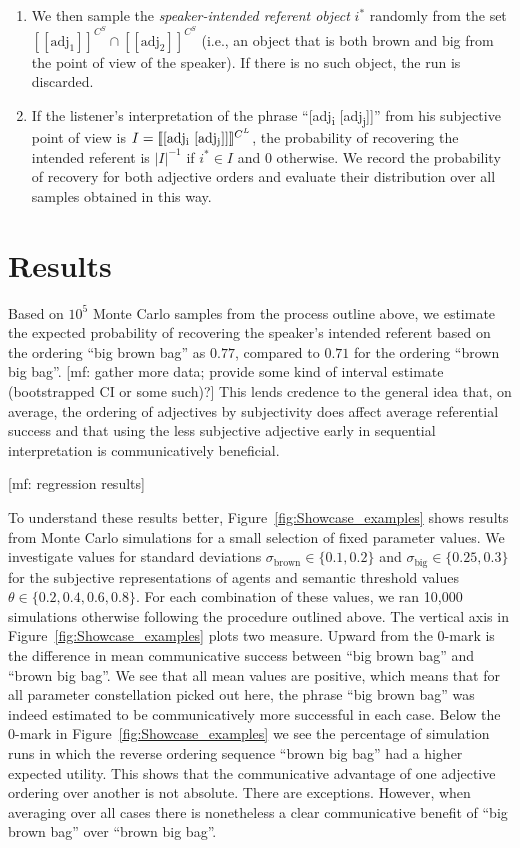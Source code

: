 \documentclass[10pt,a4paper]{article}
\newcommand{\den}[1]{\ensuremath{[\![#1]\!]}}
\newcommand{\mf}[1]{\textcolor{BrickRed}{[mf: #1]}}
\begin{document}
\begin{enumerate}
\item We then sample the \emph{speaker-intended referent object} $i^*$ randomly
  from the set $\den{\text{adj}_1}^{C^S} \cap \den{\text{adj}_2}^{C^S}$ (i.e.,
  an object that is both brown and big from the point of view of the speaker).
  If there is no such object, the run is discarded.
  
\item If the listener's interpretation of the phrase ``[adj\textsubscript{i}
  [adj\textsubscript{j}]]'' from his subjective point of view is $I =
  \den{\text{[adj\textsubscript{i} [adj\textsubscript{j}]]}}^{C^L}$, the
  probability of recovering the intended referent is $|I|^{-1}$ if $i^* \in I$
  and 0 otherwise. We record the probability of recovery for both adjective
  orders and evaluate their distribution over all samples obtained in this way.

\end{enumerate}

\section{Results}

Based on $10^5$ Monte Carlo samples from the process outline above, we estimate the expected probability of recovering the speaker's intended referent based on the ordering ``big brown bag'' as $0.77$, compared to $0.71$ for the ordering ``brown big bag''. \mf{gather more data; provide some kind of interval estimate (bootstrapped CI or some such)?} This lends credence to the general idea that, on average, the ordering of adjectives by subjectivity does affect average referential success and that using the less subjective adjective early in sequential interpretation is communicatively beneficial.

\mf{regression results}

To understand these results better, Figure~\ref{fig:Showcase_examples} shows results from Monte Carlo simulations for a small selection of fixed parameter values. We investigate values for standard deviations $\sigma_{\text{brown}} \in \{0.1, 0.2\}$ and $\sigma_{\text{big}} \in \{0.25, 0.3\}$ for the subjective representations of agents and semantic threshold values $\theta \in \{ 0.2, 0.4, 0.6, 0.8 \}$. For each combination of these values, we ran 10,000 simulations otherwise following the procedure outlined above. The vertical axis in Figure~\ref{fig:Showcase_examples} plots two measure. Upward from the 0-mark is the difference in mean communicative success between ``big brown bag'' and ``brown big bag''. We see that all mean values are positive, which means that for all parameter constellation picked out here, the phrase ``big brown bag'' was indeed estimated to be communicatively more successful in each case. Below the 0-mark in Figure~\ref{fig:Showcase_examples} we see the percentage of simulation runs in which the reverse ordering sequence ``brown big bag'' had a higher expected utility. This shows that the communicative advantage of one adjective ordering over another is not absolute. There are exceptions. However, when averaging over all cases there is nonetheless a clear communicative benefit of ``big brown bag'' over ``brown big bag''.
\end{document}
